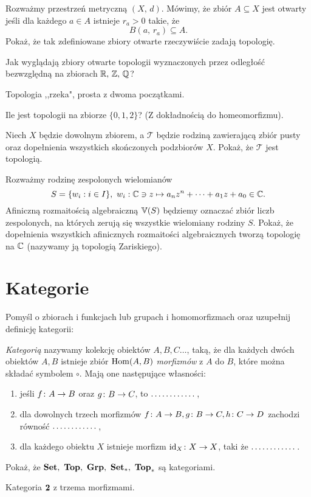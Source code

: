 \begin{problem}
  Rozważmy przestrzeń metryczną $(X,\, d)$. Mówimy, że zbiór $A\subseteq X$ jest otwarty jeśli dla każdego $a\in A$ istnieje $r_a>0$ takie, że
  $$B(a,\, r_a)\subseteq A.$$
  Pokaż, że tak zdefiniowane zbiory otwarte rzeczywiście zadają topologię.
\end{problem}

\begin{problem}
  Jak wyglądają zbiory otwarte topologii wyznaczonych przez odległość bezwzględną na zbiorach $\mathbb{R},\, \mathbb{Z},\, \mathbb{Q}$?
\end{problem}

\begin{example}
  Topologia ,,rzeka", prosta z dwoma początkami.
\end{example}

\begin{problem}
  Ile jest topologii na zbiorze $\{0,1,2\}$? (Z dokładnością do homeomorfizmu).
\end{problem}

\begin{problem}
  Niech $X$ będzie dowolnym zbiorem, a $\mathcal T$ będzie rodziną zawierającą zbiór pusty oraz dopełnienia wszystkich skończonych podzbiorów $X$. Pokaż, że $\mathcal T$ jest topologią.
\end{problem}

\begin{problem}
  Rozważmy rodzinę zespolonych wielomianów
  \[
    S=\{w_i : i\in I\},~w_i: \mathbb{C} \ni z \mapsto a_nz^n+\dots+a_1z+a_0\in \mathbb{C}.
  \]
  Afiniczną rozmaitością algebraiczną $\operatorname{\mathbb V}(S)$ będziemy oznaczać zbiór liczb zespolonych, na których zerują się wszystkie wielomiany rodziny $S$.
  Pokaż, że dopełnienia wszystkich afinicznych rozmaitości algebraicznych tworzą topologię na $\mathbb{C}$ (nazywamy ją topologią Zariskiego).
\end{problem}

\section{Kategorie}
\begin{problem}
  Pomyśl o zbiorach i funkcjach lub grupach i homomorfizmach oraz uzupełnij definicję kategorii:

  \emph{Kategorią} nazywamy kolekcję obiektów $A, B, C\dots$, taką, że dla każdych dwóch obiektów $A, B$ istnieje zbiór $\operatorname{Hom}(A, B)$ \textit{morfizmów} z $A$ do $B$, które można składać symbolem $\circ$. Mają one następujące własności:
  \begin{enumerate}
    \item jeśli $f\colon A\to B$ oraz $g\colon B\to C$, to $\dots\dots\dots\dots$,
    \item dla dowolnych trzech morfizmów $f\colon A\to B, g\colon B\to C, h\colon C\to D$ zachodzi równość $\dots\dots\dots\dots$,
    \item dla każdego obiektu $X$ istnieje morfizm $\mathrm{id}_{X}\colon X\to X$, taki że $\dots\dots\dots\dots$.
\end{enumerate}
\end{problem}

\vspace{-1cm}

\begin{problem}
  Pokaż, że $\textbf{Set},~\textbf{Top},~\textbf{Grp},~\textbf{Set}_*,~\textbf{Top}_*$ są kategoriami.
\end{problem}

\begin{example}
  Kategoria $\textbf 2$ z trzema morfizmami.
\end{example}

